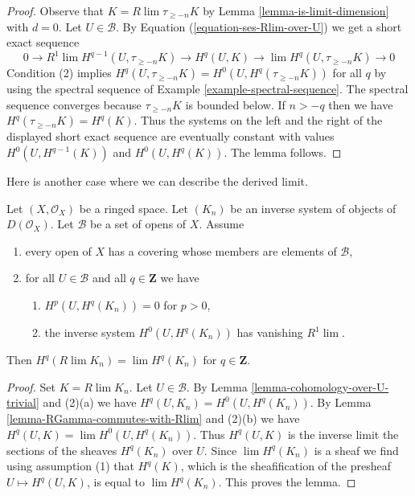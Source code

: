 \begin{proof}
Observe that $K = R\lim \tau_{\geq -n} K$ by
Lemma \ref{lemma-is-limit-dimension} with $d = 0$.
Let $U \in \mathcal{B}$. By Equation (\ref{equation-ses-Rlim-over-U})
we get a short exact sequence
$$
0 \to R^1\lim H^{q - 1}(U, \tau_{\geq -n}K) \to
H^q(U, K) \to \lim H^q(U, \tau_{\geq -n}K) \to 0
$$
Condition (2) implies
$H^q(U, \tau_{\geq -n} K) = H^0(U, H^q(\tau_{\geq -n} K))$
for all $q$ by using the spectral sequence of
Example \ref{example-spectral-sequence}.
The spectral sequence converges because $\tau_{\geq -n}K$ is bounded
below. If $n > -q$ then we have $H^q(\tau_{\geq -n}K) = H^q(K)$.
Thus the systems on the left and the right of the displayed
short exact sequence are eventually constant with values
$H^0(U, H^{q - 1}(K))$ and $H^0(U, H^q(K))$. The lemma follows.
\end{proof}

\noindent
Here is another case where we can describe the derived limit.

\begin{lemma}
\label{lemma-derived-limit-suitable-system}
Let $(X, \mathcal{O}_X)$ be a ringed space. Let $(K_n)$
be an inverse system of objects of $D(\mathcal{O}_X)$.
Let $\mathcal{B}$ be a set of opens of $X$. Assume
\begin{enumerate}
\item every open of $X$ has a covering whose members are
elements of $\mathcal{B}$,
\item for all $U \in \mathcal{B}$ and all $q \in \mathbf{Z}$ we have
\begin{enumerate}
\item $H^p(U, H^q(K_n)) = 0$ for $p > 0$,
\item the inverse system $H^0(U, H^q(K_n))$ has vanishing $R^1\lim$.
\end{enumerate}
\end{enumerate}
Then $H^q(R\lim K_n) = \lim H^q(K_n)$ for $q \in \mathbf{Z}$.
\end{lemma}

\begin{proof}
Set $K = R\lim K_n$. Let $U \in \mathcal{B}$.
By Lemma \ref{lemma-cohomology-over-U-trivial} and (2)(a)
we have $H^q(U, K_n) = H^0(U, H^q(K_n))$. By
Lemma \ref{lemma-RGamma-commutes-with-Rlim} and (2)(b) we have 
$H^q(U, K) = \lim H^0(U, H^q(K_n))$. Thus $H^q(U, K)$ is the inverse limit
the sections of the sheaves $H^q(K_n)$ over $U$. Since
$\lim H^q(K_n)$ is a sheaf we find using assumption (1) that $H^q(K)$,
which is the sheafification of the presheaf $U \mapsto H^q(U, K)$,
is equal to $\lim H^q(K_n)$. This proves the lemma.
\end{proof}








